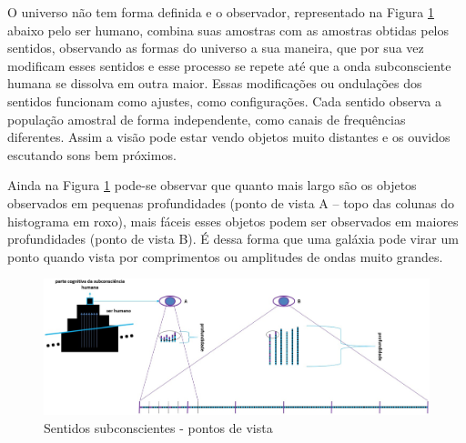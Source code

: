 O universo não tem forma definida e o observador, representado na Figura \ref{fig:consciousness_amplitude_viewpoint} abaixo pelo ser humano, combina suas amostras com as amostras obtidas pelos sentidos, observando as formas do universo a sua maneira, que por sua vez modificam esses sentidos e esse processo se repete até que a onda subconsciente humana se dissolva em outra maior. Essas modificações ou ondulações dos sentidos funcionam como ajustes, como configurações. Cada sentido observa a população amostral de forma independente, como canais de frequências diferentes. Assim a visão pode estar vendo objetos muito distantes e os ouvidos escutando sons bem próximos.

Ainda na Figura \ref{fig:consciousness_amplitude_viewpoint}  pode-se observar que quanto mais largo são os objetos observados em pequenas profundidades (ponto de vista A – topo das colunas do histograma em roxo), mais fáceis esses objetos podem ser observados em maiores profundidades (ponto de vista B). É dessa forma que uma galáxia pode virar um ponto quando vista por comprimentos ou amplitudes de ondas muito grandes.
	\begin{figure}[H]
	\caption{Sentidos subconscientes - pontos de vista}
	\label{fig:consciousness_amplitude_viewpoint}
	\centering
	\includegraphics[scale=.4]{sections/images/consciousness_amplitude_viewpoint.jpg}
	\end{figure}

